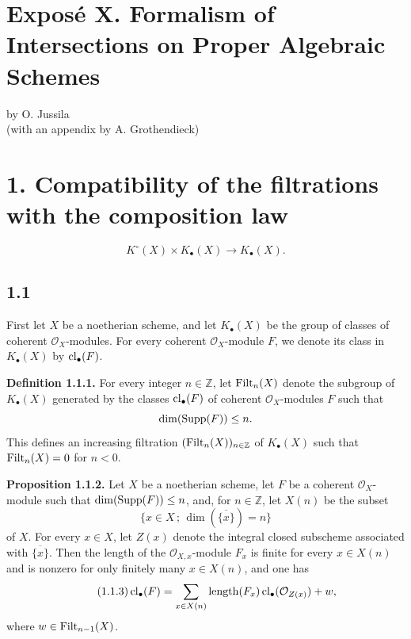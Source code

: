
\section*{Expos\'e X. Formalism of Intersections on Proper Algebraic Schemes}
\begin{center}
by O. Jussila\\
(with an appendix by A. Grothendieck)
\end{center}

\section*{1. Compatibility of the filtrations with the composition law}
\[
K^\circ(X)\times K_\bullet(X)\longrightarrow K_\bullet(X).
\]

\subsection*{1.1}
First let $X$ be a noetherian scheme, and let $K_\bullet(X)$ be the group of
classes of coherent $\mathcal O_X$-modules. For every coherent
$\mathcal O_X$-module $F$, we denote its class in $K_\bullet(X)$ by
$\operatorname{cl}_\bullet(F)$.

\textbf{Definition 1.1.1.}
For every integer $n\in\mathbb Z$, let $\operatorname{Filt}_n(X)$ denote the subgroup of
$K_\bullet(X)$ generated by the classes $\operatorname{cl}_\bullet(F)$ of coherent
$\mathcal O_X$-modules $F$ such that
\[
\dim(\operatorname{Supp}(F))\leq n.
\]
This defines an increasing filtration $(\operatorname{Filt}_n(X))_{n\in\mathbb Z}$ of
$K_\bullet(X)$ such that $\operatorname{Filt}_n(X)=0$ for $n<0$.

\textbf{Proposition 1.1.2.}
Let $X$ be a noetherian scheme, let $F$ be a coherent $\mathcal O_X$-module
such that $\dim(\operatorname{Supp}(F))\leq n$, and, for $n\in\mathbb Z$, let $X(n)$ be the
subset
\[
\{x\in X\,;\,\dim(\overline{\{x\}})=n\}
\]
of $X$. For every $x\in X$, let $Z(x)$ denote the integral closed subscheme
associated with $\overline{\{x\}}$. Then the length of the
$\mathcal O_{X,x}$-module $F_x$ is finite for every $x\in X(n)$ and is
nonzero for only finitely many $x\in X(n)$, and one has
\begin{equation}\tag{1.1.3}
\operatorname{cl}_\bullet(F)=
\sum_{x\in X(n)}\operatorname{length}(F_x)\operatorname{cl}_\bullet(\mathcal O_{Z(x)})+w,
\end{equation}
where $w\in\operatorname{Filt}_{n-1}(X)$.

